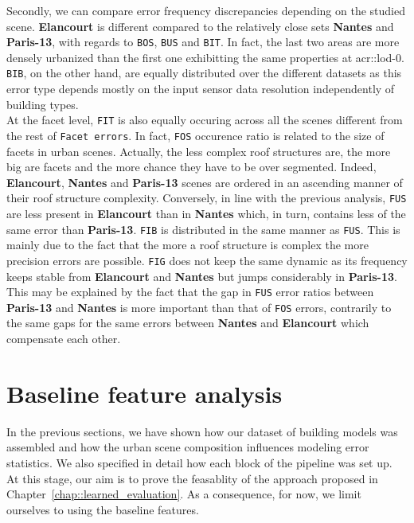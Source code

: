         Secondly, we can compare error frequency discrepancies depending on the studied scene.
        \textbf{Elancourt} is different compared to the relatively close sets \textbf{Nantes} and \textbf{Paris-13}, with regards to \texttt{BOS}, \texttt{BUS} and \texttt{BIT}.
        In fact, the last two areas are more densely urbanized than the first one exhibitting the same properties at \gls{acr::lod}-0.
        \texttt{BIB}, on the other hand, are equally distributed over the different datasets as this error type depends mostly on the input sensor data resolution independently of building types.\\
        At the facet level, \texttt{FIT} is also equally occuring across all the scenes different from the rest of \texttt{Facet errors}.
        In fact, \texttt{FOS} occurence ratio is related to the size of facets in urban scenes.
        Actually, the less complex roof structures are, the more big are facets and the more chance they have to be over segmented.
        Indeed, \textbf{Elancourt}, \textbf{Nantes} and \textbf{Paris-13} scenes are ordered in an ascending manner of their roof structure complexity.
        Conversely, in line with the previous analysis, \texttt{FUS} are less present in \textbf{Elancourt} than in \textbf{Nantes} which, in turn, contains less of the same error than \textbf{Paris-13}.
        \texttt{FIB} is distributed in the same manner as \texttt{FUS}.
        This is mainly due to the fact that the more a roof structure is complex the more precision errors are possible.
        \texttt{FIG} does not keep the same dynamic as its frequency keeps stable from \textbf{Elancourt} and \textbf{Nantes} but jumps considerably in \textbf{Paris-13}.
        This may be explained by the fact that the gap in \texttt{FUS} error ratios between \textbf{Paris-13} and \textbf{Nantes} is more important than that of \texttt{FOS} errors, contrarily to the same gaps for the same errors between \textbf{Nantes} and \textbf{Elancourt} which compensate each other.

\section{Baseline feature analysis}
    \label{sec::experiments::baseline_feature_analysis}
    In the previous sections, we have shown how our dataset of building models was assembled and how the urban scene composition influences modeling error statistics.
    We also specified in detail how each block of the pipeline was set up.
    At this stage, our aim is to prove the feasablity of the approach proposed in Chapter~\ref{chap::learned_evaluation}.
    As a consequence, for now, we limit ourselves to using the baseline features.\\

